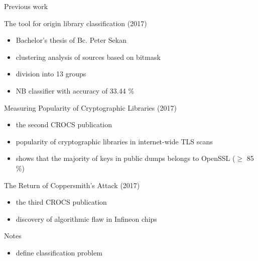 \documentclass[
]{beamer}
\newcommand\Fontsmall{\fontsize{8}{7.2}\selectfont}
\begin{document}
\begin{frame}{Previous work}

  \Fontsmall

\begin{alertblock}{The tool for origin library classification (2017)}
  \begin{itemize}
    \item Bachelor's thesis of Bc. Peter Sekan
    \item clustering analysis of sources based on bitmask
    \item division into 13 groups
    \item NB classifier with accuracy of 33.44 \%
  \end{itemize}
\end{alertblock}

\begin{alertblock}{Measuring Popularity of Cryptographic Libraries (2017)}
  \begin{itemize}
    \item the second CROCS publication
    \item popularity of cryptographic libraries in internet-wide TLS scans
    \item shows that the majority of keys in public dumps belongs to OpenSSL ($\geq$ 85 \%)
  \end{itemize}
\end{alertblock}

\begin{alertblock}{The Return of Coppersmith’s Attack (2017)}
  \begin{itemize}
    \item the third CROCS publication
    \item discovery of algorithmic flaw in Infineon chips
  \end{itemize}
\end{alertblock}

\end{frame}

\begin{frame}{Notes}
  \begin{itemize}
    \item define classification problem
  \end{itemize}
\end{frame}

\end{document}
